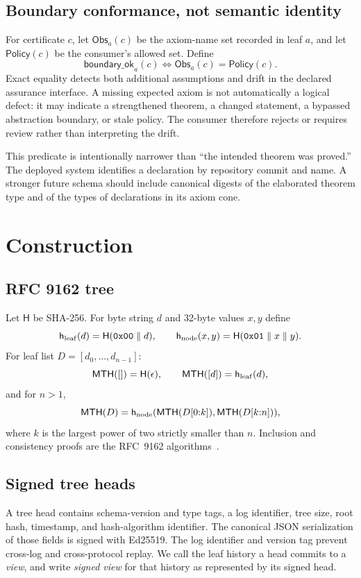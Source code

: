\documentclass[11pt]{article}
\theoremstyle{remark}
\newcommand{\Hh}{\mathsf{H}}
\newcommand{\hleaf}{\mathsf{h}_{\rm leaf}}
\newcommand{\hnode}{\mathsf{h}_{\rm node}}
\newcommand{\MTH}{\mathsf{MTH}}
\newcommand{\Obs}{\mathsf{Obs}}
\newcommand{\Policy}{\mathsf{Policy}}
\begin{document}
\subsection{Boundary conformance, not semantic identity}

For certificate $c$, let $\Obs_a(c)$ be the axiom-name set recorded in leaf
$a$, and let $\Policy(c)$ be the consumer's allowed set. Define
\[
\mathsf{boundary\_ok}_a(c) \iff \Obs_a(c)=\Policy(c).
\]
Exact equality detects both additional assumptions and drift in the declared
assurance interface. A missing expected axiom is not automatically a logical
defect: it may indicate a strengthened theorem, a changed statement, a bypassed
abstraction boundary, or stale policy. The consumer therefore rejects or
requires review rather than interpreting the drift.

This predicate is intentionally narrower than ``the intended theorem was
proved.'' The deployed system identifies a declaration by repository commit
and name. A stronger future schema should include canonical digests of the
elaborated theorem type and of the types of declarations in its axiom cone.

\section{Construction}\label{sec:construction}

\subsection{RFC 9162 tree}

Let $\Hh$ be SHA-256. For byte string $d$ and 32-byte values $x,y$ define
\[
\hleaf(d)=\Hh(\mathtt{0x00}\parallel d),\qquad
\hnode(x,y)=\Hh(\mathtt{0x01}\parallel x\parallel y).
\]
For leaf list $D=[d_0,\ldots,d_{n-1}]$:
\[
\MTH([])=\Hh(\epsilon),\qquad \MTH([d])=\hleaf(d),
\]
and for $n>1$,
\[
\MTH(D)=\hnode(\MTH(D[0{:}k]),\MTH(D[k{:}n])),
\]
where $k$ is the largest power of two strictly smaller than $n$. Inclusion and
consistency proofs are the RFC~9162 algorithms~\cite{ct2}.

\subsection{Signed tree heads}

A tree head contains schema-version and type tags, a log identifier, tree
size, root hash, timestamp, and hash-algorithm identifier. The canonical JSON serialization of
those fields is signed with Ed25519. The log identifier and version tag prevent
cross-log and cross-protocol replay. We call the leaf history a head
commits to a \emph{view}, and write \emph{signed view} for that history
as represented by its signed head.
\end{document}

